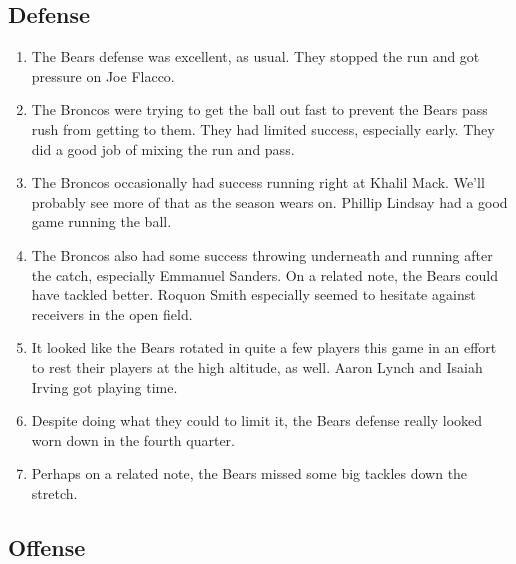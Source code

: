 \documentclass[11pt]{article}
\begin{document}
\subsection*{Defense}

\begin{enumerate}
\item The Bears defense was excellent, as usual.  They stopped the run and got pressure on Joe Flacco.
\item The Broncos were trying to get the ball out fast to prevent the Bears pass rush from getting to them.  They had limited success, especially early.  They did a good job of mixing the run and pass.
\item The Broncos occasionally had success running right at Khalil Mack.  We'll probably see more of that as the season wears on.  Phillip Lindsay had a good game running the ball.
\item The Broncos also had some success throwing underneath and running after the catch, especially Emmanuel Sanders.  On a related note, the Bears could have tackled better.  Roquon Smith especially seemed to hesitate against receivers in the open field.
\item It looked like the Bears rotated in quite a few players this game in an effort to rest their players at the high altitude, as well.  Aaron Lynch and Isaiah Irving got playing time.
\item Despite doing what they could to limit it, the Bears defense really looked worn down in the fourth quarter.
\item Perhaps on a related note, the Bears missed some big tackles down the stretch.
\end{enumerate}

\subsection*{Offense}
\end{document}
